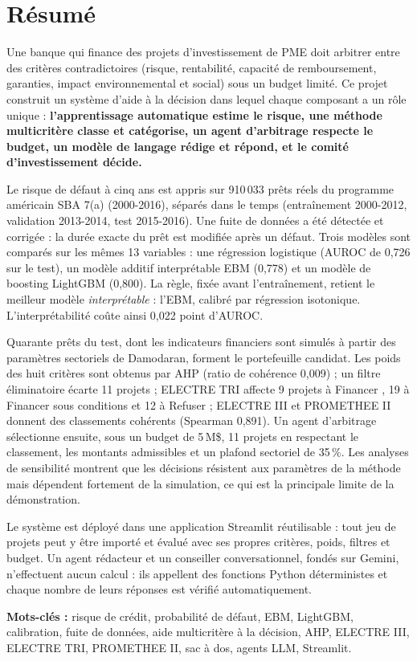 \chapter*{Résumé}

Une banque qui finance des projets d'investissement de PME doit arbitrer entre des critères contradictoires
(risque, rentabilité, capacité de remboursement, garanties, impact environnemental et social) sous un budget
limité. Ce projet construit un système d'aide à la décision dans lequel chaque composant a un rôle unique :
\textbf{l'apprentissage automatique estime le risque, une méthode multicritère classe et catégorise, un agent
d'arbitrage respecte le budget, un modèle de langage rédige et répond, et le comité d'investissement décide.}

Le risque de défaut à cinq ans est appris sur 910\,033 prêts réels du programme américain SBA 7(a) (2000-2016),
séparés dans le temps (entraînement 2000-2012, validation 2013-2014, test 2015-2016). Une fuite de données a été
détectée et corrigée : la durée exacte du prêt est modifiée après un défaut. Trois modèles sont comparés sur les
mêmes 13 variables : une régression logistique (AUROC de 0,726 sur le test), un modèle additif interprétable EBM
(0,778) et un modèle de boosting LightGBM (0,800). La règle, fixée avant l'entraînement, retient le meilleur modèle
\emph{interprétable} : l'EBM, calibré par régression isotonique. L'interprétabilité coûte ainsi 0,022 point d'AUROC.

Quarante prêts du test, dont les indicateurs financiers sont simulés à partir des paramètres sectoriels de
Damodaran, forment le portefeuille candidat. Les poids des huit critères sont obtenus par AHP (ratio de cohérence
0,009) ; un filtre éliminatoire écarte 11 projets ; ELECTRE TRI affecte 9 projets à \og Financer \fg{}, 19 à
\og Financer sous conditions \fg{} et 12 à \og Refuser \fg{} ; ELECTRE III et PROMETHEE II donnent des classements
cohérents (Spearman 0,891). Un agent d'arbitrage sélectionne ensuite, sous un budget de 5\,M\$, 11 projets en
respectant le classement, les montants admissibles et un plafond sectoriel de 35\,\%. Les analyses de sensibilité
montrent que les décisions résistent aux paramètres de la méthode mais dépendent fortement de la simulation, ce qui
est la principale limite de la démonstration.

Le système est déployé dans une application Streamlit réutilisable : tout jeu de projets peut y être importé et
évalué avec ses propres critères, poids, filtres et budget. Un agent rédacteur et un conseiller conversationnel,
fondés sur Gemini, n'effectuent aucun calcul : ils appellent des fonctions Python déterministes et chaque nombre de
leurs réponses est vérifié automatiquement.

\medskip
\noindent\textbf{Mots-clés :} risque de crédit, probabilité de défaut, EBM, LightGBM, calibration, fuite de données,
aide multicritère à la décision, AHP, ELECTRE III, ELECTRE TRI, PROMETHEE II, sac à dos, agents LLM, Streamlit.
